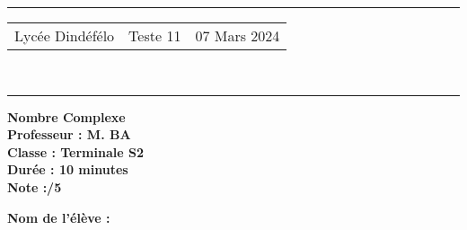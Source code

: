 \documentclass[a4paper,12pt]{article}
\begin{document}
\hrule %
\begin{center}
    \begin{tabular}{@{} p{5cm} p{5cm} p{5cm} @{}} %
        Lycée Dindéfélo & \quad\quad Teste 11 & 07 Mars 2024 \\
    \end{tabular}
    \\[-0.01cm] %
    \hrule %
\end{center}
\begin{center}
    \textbf{\Large Nombre Complexe} \\[0.2cm]
    \textbf{\large Professeur : M. BA} \\[0.2cm]
    \textbf{Classe : Terminale S2} \\[0.2cm]
    \textbf{\small Durée : 10 minutes} \\[0.2cm]
    \textbf{\small Note :\quad\quad /5}
\end{center}

\textbf{\small Nom de l'élève :} \underline{\hspace{8cm}} \\[0.5cm]
\end{document}
